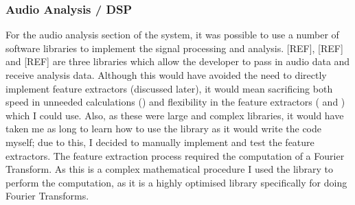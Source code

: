 \subsubsection{Audio Analysis / DSP}
For the audio analysis section of the system, it was possible to use a number of software libraries to implement the signal processing and analysis. [REF], [REF] and [REF] are three libraries which allow the developer to pass in audio data and receive analysis data. Although this would have avoided the need to directly implement feature extractors (discussed later), it would mean sacrificing both speed in unneeded calculations () and flexibility in the feature extractors ( and ) which I could use. Also, as these were large and complex libraries, it would have taken me as long to learn how to use the library as it would write the code myself; due to this, I decided to manually implement and test the feature extractors.
The feature extraction process required the computation of a Fourier Transform. As this is a complex mathematical procedure I used the  library to perform the computation, as it is a highly optimised library specifically for doing Fourier Transforms.
